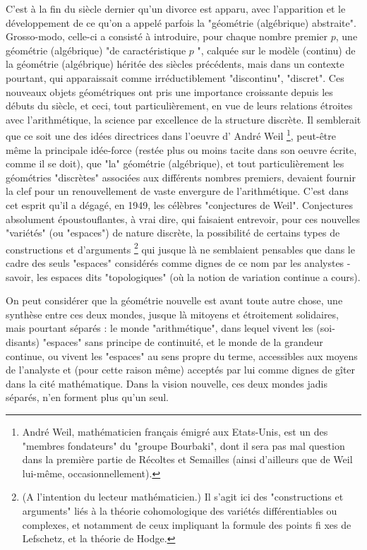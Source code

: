 C'est à la fin du siècle dernier qu'un divorce est apparu, avec l'apparition et le développement de ce qu'on a appelé parfois la "géométrie (algébrique) abstraite". Grosso-modo, celle-ci a consisté à introduire, pour chaque nombre premier $p$, une géométrie (algébrique) "de caractéristique $p$ ", calquée sur le modèle (continu) de la géométrie (algébrique) héritée des siècles précédents, mais dans un contexte pourtant, qui apparaissait comme irréductiblement "discontinu", "discret". Ces nouveaux objets géométriques ont pris une importance croissante depuis les débuts du siècle, et ceci, tout particulièrement, en vue de leurs relations étroites avec l'arithmétique, la science par excellence de la structure discrète. Il semblerait que ce soit une des idées directrices dans l'oeuvre d' André Weil \footnote{André Weil, mathématicien français émigré aux Etats-Unis, est un des "membres fondateurs" du "groupe Bourbaki", dont il sera pas mal question dans la première partie de Récoltes et Semailles (ainsi d'ailleurs que de Weil lui-même, occasionnellement).}, peut-être même la principale idée-force (restée plus ou moins tacite dans son oeuvre écrite, comme il se doit), que "la" géométrie (algébrique), et tout particulièrement les géométries "discrètes" associées aux différents nombres premiers, devaient fournir la clef pour un renouvellement de vaste envergure de l'arithmétique. C'est dans cet esprit qu'il a dégagé, en 1949, les célèbres "conjectures de Weil". Conjectures absolument époustouflantes, à vrai dire, qui faisaient entrevoir, pour ces nouvelles "variétés" (ou "espaces") de nature discrète, la possibilité de certains types de constructions et d'arguments \footnote{(A l'intention du lecteur mathématicien.) Il s'agit ici des "constructions et arguments" liés à la théorie cohomologique des variétés différentiables ou complexes, et notamment de ceux impliquant la formule des points fi xes de Lefschetz, et la théorie de Hodge.} qui jusque là ne semblaient pensables que dans le cadre des seuls "espaces" considérés comme dignes de ce nom par les analystes - savoir, les espaces dits "topologiques" (où la notion de variation continue a cours).

On peut considérer que la géométrie nouvelle est avant toute autre chose, une synthèse entre ces deux mondes, jusque là mitoyens et étroitement solidaires, mais pourtant séparés : le monde "arithmétique", dans lequel vivent les (soi-disants) "espaces" sans principe de continuité, et le monde de la grandeur continue, ou vivent les "espaces" au sens propre du terme, accessibles aux moyens de l'analyste et (pour cette raison même) acceptés par lui comme dignes de gîter dans la cité mathématique. Dans la vision nouvelle, ces deux mondes jadis séparés, n'en forment plus qu'un seul.

